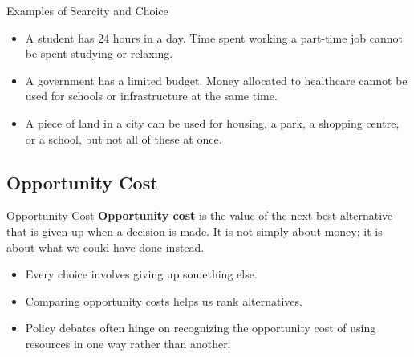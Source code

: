 \documentclass[aspectratio=169]{beamer}
\begin{document}
\begin{frame}{Examples of Scarcity and Choice}
  \transfade
  \begin{itemize}[<+->]
    \item A student has 24 hours in a day. Time spent working a part-time job cannot be spent
    studying or relaxing.
    \item A government has a limited budget. Money allocated to healthcare cannot be used for
    schools or infrastructure at the same time.
    \item A piece of land in a city can be used for housing, a park, a shopping centre, or a school,
    but not all of these at once.
  \end{itemize}


\end{frame}

\subsection{Opportunity Cost}

\begin{frame}{Opportunity Cost}
  \transfade
  \textbf{Opportunity cost} is the value of the next best alternative that is given up when a decision
  is made. It is not simply about money; it is about what we could have done instead.

  \vspace{0.3cm}
  \begin{itemize}[<+->]
    \item Every choice involves giving up something else.
    \item Comparing opportunity costs helps us rank alternatives.
    \item Policy debates often hinge on recognizing the opportunity cost of using resources in one
    way rather than another.
  \end{itemize}
\end{frame}
\end{document}
